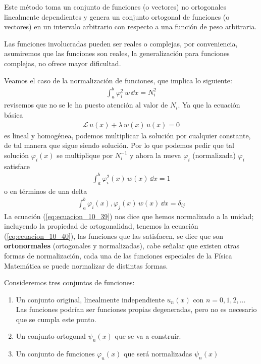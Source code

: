 Este método toma un conjunto de funciones (o vectores) no ortogonales linealmente dependientes y genera un conjunto ortogonal de funciones (o vectores) en un intervalo arbitrario con respecto a una función de peso arbitraria.
\par
Las funciones involucradas pueden ser reales o complejas, por conveniencia, asumiremos que las funciones son reales, la generalización para funciones complejas, no ofrece mayor dificultad.
\par
Veamos el caso de la normalización de funciones, que implica lo siguiente:
\begin{align*}
\int_{a}^{b} \varphi_{i}^{2} \, w \, \dd{x}  =  N_{i}^{2}
\end{align*}
revisemos que no se le ha puesto atención al valor de $N_{i}$. Ya que la ecuación básica 
\begin{align}
\mathcal{L} \, u(x) + \lambda \, w(x) \, u(x) = 0
\label{eq:ecuacion_10_08}
\end{align}
es lineal y homogénea, podemos multiplicar la solución por cualquier constante, de tal manera que sigue siendo solución. Por lo que podemos pedir que tal solución $\varphi_{i}(x)$ se multiplique por $N_{i}^{-1}$ y ahora la nueva $\varphi_{i}$ (normalizada) $\varphi_{i}$ satisface
\begin{align}
\int_{a}^{b} \varphi_{i}^{2} (x) \, w(x) \, \dd{x} = 1
\label{eq:ecuacion_10_39}
\end{align}
o en términos de una delta
\begin{align}
\int_{a}^{b} \varphi_{i}(x) , \varphi_{j} (x) \, w(x) \, \dd{x} = \delta_{ij}
\label{eq:ecuacion_10_40}
\end{align}
La ecuación (\ref{eq:ecuacion_10_39}) nos dice que hemos normalizado a la unidad; incluyendo la propiedad de ortogonalidad, tenemos la ecuación (\ref{eq:ecuacion_10_40}), las funciones que las satisfacen, se dice que son \textbf{ortonormales} (ortogonales y normalizadas), cabe señalar que existen otras formas de normalización, cada una de las funciones especiales de la Física Matemática se puede normalizar de distintas formas.
\par
Consideremos tres conjuntos de funciones:
\begin{enumerate}
\item Un conjunto original, linealmente independiente $u_{n}(x)$ con $n=0,1,2,\ldots$ \\
Las funciones podrían ser funciones propias degeneradas, pero no es necesario que se cumpla este punto.
\item Un conjunto ortogonal $\psi_{n}(x)$ que se va a construir.
\item Un conjunto de funciones $\varphi_{n}(x)$ que será normalizadas $\psi_{n}(x)$
\end{enumerate}
